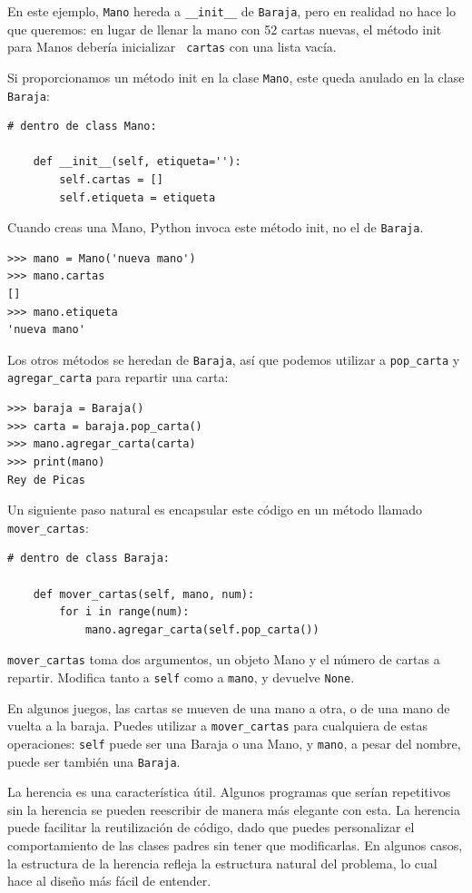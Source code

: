 \documentclass[10pt]{book}
\begin{document}
En este ejemplo, {\tt Mano} hereda a \verb"__init__" de {\tt Baraja},
pero en realidad no hace lo que queremos: en lugar de llenar la mano
con 52 cartas nuevas, el método init para Manos debería inicializar {\tt
  cartas} con una lista vacía.   

Si proporcionamos un método init en la clase {\tt Mano}, este queda anulado
en la clase {\tt Baraja}:

\begin{verbatim}
# dentro de class Mano:

    def __init__(self, etiqueta=''):
        self.cartas = []
        self.etiqueta = etiqueta
\end{verbatim}
%
Cuando creas una Mano, Python invoca este método init, no el
de {\tt Baraja}.

\begin{verbatim}
>>> mano = Mano('nueva mano')
>>> mano.cartas
[]
>>> mano.etiqueta
'nueva mano'
\end{verbatim}
%
Los otros métodos se heredan de {\tt Baraja}, así que podemos utilizar a
\verb"pop_carta" y \verb"agregar_carta" para repartir una carta:

\begin{verbatim}
>>> baraja = Baraja()
>>> carta = baraja.pop_carta()
>>> mano.agregar_carta(carta)
>>> print(mano)
Rey de Picas
\end{verbatim}
%
Un siguiente paso natural es encapsular este código en un método
llamado \verb"mover_cartas":

\begin{verbatim}
# dentro de class Baraja:

    def mover_cartas(self, mano, num):
        for i in range(num):
            mano.agregar_carta(self.pop_carta())
\end{verbatim}
%
\verb"mover_cartas" toma dos argumentos, un objeto Mano y el número de
cartas a repartir.  Modifica tanto a {\tt self} como a {\tt mano}, y
devuelve {\tt None}.

En algunos juegos, las cartas se mueven de una mano a otra,
o de una mano de vuelta a la baraja.  Puedes utilizar a \verb"mover_cartas"
para cualquiera de estas operaciones: {\tt self} puede ser una Baraja
o una Mano, y {\tt mano}, a pesar del nombre, puede ser también una {\tt Baraja}.

La herencia es una característica útil.  Algunos programas que serían
repetitivos sin la herencia se pueden reescribir de manera más elegante
con esta.  La herencia puede facilitar la reutilización de código, dado que puedes
personalizar el comportamiento de las clases padres sin tener que
modificarlas.  En algunos casos, la estructura de la herencia refleja la estructura
natural del problema, lo cual hace al diseño más fácil
de entender.
\end{document}
